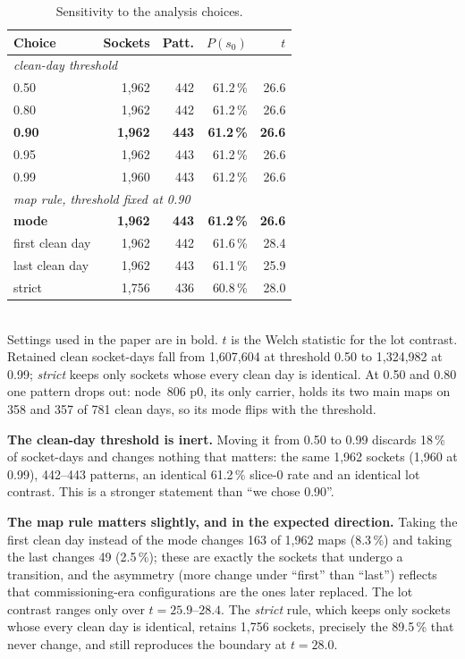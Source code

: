 \documentclass[10pt,conference]{IEEEtran}
\begin{document}
\begin{table}[h]\centering\caption{Sensitivity to the analysis choices.}\label{tab:sens}
\footnotesize
\begin{tabular}{lrrrr}\toprule
Choice & Sockets & Patt. & $P(s_0)$ & $t$\\\midrule
\multicolumn{5}{l}{\emph{clean-day threshold}}\\
0.50 & 1{,}962 & 442 & 61.2\,\% & 26.6\\
0.80 & 1{,}962 & 442 & 61.2\,\% & 26.6\\
\textbf{0.90} & \textbf{1{,}962} & \textbf{443} & \textbf{61.2\,\%} & \textbf{26.6}\\
0.95 & 1{,}962 & 443 & 61.2\,\% & 26.6\\
0.99 & 1{,}960 & 443 & 61.2\,\% & 26.6\\\midrule
\multicolumn{5}{l}{\emph{map rule, threshold fixed at 0.90}}\\
\textbf{mode} & \textbf{1{,}962} & \textbf{443} & \textbf{61.2\,\%} & \textbf{26.6}\\
first clean day & 1{,}962 & 442 & 61.6\,\% & 28.4\\
last clean day & 1{,}962 & 443 & 61.1\,\% & 25.9\\
strict & 1{,}756 & 436 & 60.8\,\% & 28.0\\
\bottomrule\end{tabular}
\\[2pt]\footnotesize Settings used in the paper are in bold. $t$ is the Welch statistic for the
lot contrast. Retained clean socket-days fall from 1{,}607{,}604 at threshold 0.50 to 1{,}324{,}982
at 0.99; \emph{strict} keeps only sockets whose every clean day is identical. At 0.50 and 0.80
one pattern drops out: node~806 p0, its only carrier, holds its two main maps on 358 and 357 of
781 clean days, so its mode flips with the threshold.
\end{table}

\textbf{The clean-day threshold is inert.} Moving it from 0.50 to 0.99 discards 18\,\% of
socket-days and changes nothing that matters: the same 1{,}962 sockets (1{,}960 at 0.99), 442--443
patterns, an identical 61.2\,\% slice-0 rate and an identical lot contrast. This is a stronger
statement than ``we chose 0.90''.

\textbf{The map rule matters slightly, and in the expected direction.} Taking the first clean day
instead of the mode changes 163 of 1{,}962 maps (8.3\,\%) and taking the last changes 49
(2.5\,\%); these are exactly the sockets that undergo a transition, and the asymmetry (more
change under ``first'' than ``last'') reflects that commissioning-era configurations are the ones
later replaced. The lot contrast ranges only over $t=25.9$--$28.4$. The \emph{strict} rule, which
keeps only sockets whose every clean day is identical, retains 1{,}756 sockets, precisely the
89.5\,\% that never change, and still reproduces the boundary at $t=28.0$.
\end{document}
